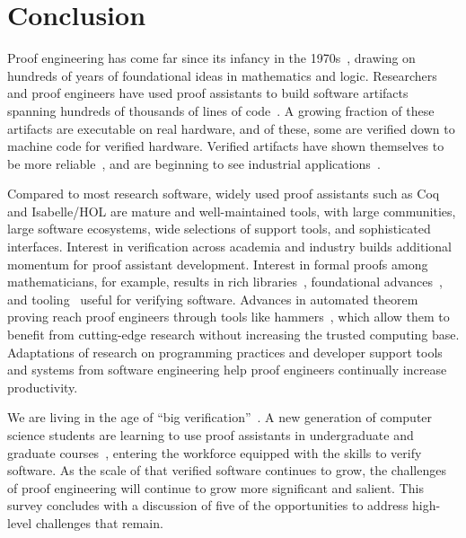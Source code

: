 \chapter{Conclusion}
\label{ch:conclusion}


Proof engineering has come far since its infancy in the 1970s~\citep{Milner1972b,Milner1972}, drawing on hundreds of years of foundational ideas in mathematics and logic. Researchers and proof engineers have used proof assistants to build software artifacts spanning hundreds of thousands of lines of code~\citep{Leroy2009,Klein2009}. %
A growing fraction of these artifacts are executable on real hardware, and of these, some are verified down to machine code for verified hardware.
Verified artifacts have shown themselves to be more reliable~\citep{Yang2011}, and are beginning to see 
industrial applications~\citep{CompCert-ERTS-2018, Erbsen2019}.

Compared to most research software, widely used proof assistants such as Coq and Isabelle/HOL are mature and well-maintained tools, with large communities, large software ecosystems, wide selections of support tools, and sophisticated interfaces.
Interest in verification across academia and industry builds additional momentum for proof assistant development.
Interest in formal proofs among mathematicians, for example, results in rich libraries~\citep{UniMath, Bauer2017}, foundational advances~\citep{univalent2013homotopy}, 
and tooling~\citep{Braibant2011} useful for verifying software.
Advances in automated theorem proving reach proof engineers through tools like hammers~\citep{Blanchette2016},
which allow them to benefit from cutting-edge research without increasing the trusted computing base.
Adaptations of research on programming practices and developer support tools and systems from software engineering
help proof engineers continually increase productivity.

We are living in the age of ``big verification''~\citep{popl-time}.
A new generation of computer science students are learning to use proof assistants in undergraduate and graduate courses~\citep{coq-classroom},
entering the workforce equipped with the skills to verify software. As the scale of that verified software continues to grow,
the challenges of proof engineering will continue to grow more 
significant and salient. This survey concludes with a discussion of five of the opportunities to address high-level challenges that remain.

